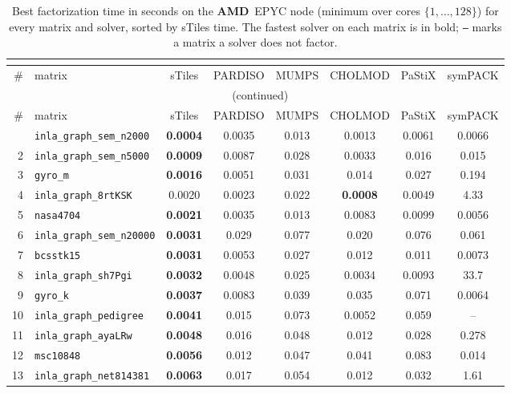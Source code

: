 \begin{footnotesize}
\setlength{\tabcolsep}{4pt}
\begin{longtable}{rl cccccc}
\caption{Best factorization time in seconds on the \textbf{AMD}~EPYC node (minimum over cores $\{1,\dots,128\}$) for every matrix and solver, sorted by sTiles time. The fastest solver on each matrix is in bold; \texttt{--} marks a matrix a solver does not factor.}\\
\label{tab:per-matrix-times-amd}\\
\toprule
\# & matrix & sTiles & PARDISO & MUMPS & CHOLMOD & PaStiX & symPACK \\
\midrule
\endfirsthead
\multicolumn{8}{c}{\footnotesize\tablename~\thetable{} (continued)}\\
\toprule
\# & matrix & sTiles & PARDISO & MUMPS & CHOLMOD & PaStiX & symPACK \\
\midrule
\endhead
\bottomrule
\endfoot
1 & \texttt{inla\_graph\_sem\_n2000} & \textbf{0.0004} & 0.0035 & 0.013 & 0.0013 & 0.0061 & 0.0066 \\
2 & \texttt{inla\_graph\_sem\_n5000} & \textbf{0.0009} & 0.0087 & 0.028 & 0.0033 & 0.016 & 0.015 \\
3 & \texttt{gyro\_m} & \textbf{0.0016} & 0.0051 & 0.031 & 0.014 & 0.027 & 0.194 \\
4 & \texttt{inla\_graph\_8rtKSK} & 0.0020 & 0.0023 & 0.022 & \textbf{0.0008} & 0.0049 & 4.33 \\
5 & \texttt{nasa4704} & \textbf{0.0021} & 0.0035 & 0.013 & 0.0083 & 0.0099 & 0.0056 \\
6 & \texttt{inla\_graph\_sem\_n20000} & \textbf{0.0031} & 0.029 & 0.077 & 0.020 & 0.076 & 0.061 \\
7 & \texttt{bcsstk15} & \textbf{0.0031} & 0.0053 & 0.027 & 0.012 & 0.011 & 0.0073 \\
8 & \texttt{inla\_graph\_sh7Pgi} & \textbf{0.0032} & 0.0048 & 0.025 & 0.0034 & 0.0093 & 33.7 \\
9 & \texttt{gyro\_k} & \textbf{0.0037} & 0.0083 & 0.039 & 0.035 & 0.071 & 0.0064 \\
10 & \texttt{inla\_graph\_pedigree} & \textbf{0.0041} & 0.015 & 0.073 & 0.0052 & 0.059 & -- \\
11 & \texttt{inla\_graph\_ayaLRw} & \textbf{0.0048} & 0.016 & 0.048 & 0.012 & 0.028 & 0.278 \\
12 & \texttt{msc10848} & \textbf{0.0056} & 0.012 & 0.047 & 0.041 & 0.083 & 0.014 \\
13 & \texttt{inla\_graph\_net814381} & \textbf{0.0063} & 0.017 & 0.054 & 0.012 & 0.032 & 1.61 \\

\end{longtable}
\end{footnotesize}
